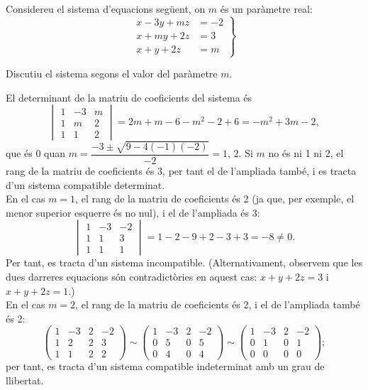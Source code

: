 Considereu el sistema d'equacions següent, on $m$ és un paràmetre real:
\[
\left.\begin{aligned}
x-3y+mz&=-2\\
x+my+2z&=3\\
x+y+2z&=m
\end{aligned}\right\}
\]

\begin{apartats}

Discutiu el sistema segons el valor del paràmetre $m$.

\begin{solucio}
El determinant de la matriu de coeficients del sistema és
\[
\begin{vmatrix}1&-3&m\\1&m&2\\1&1&2\end{vmatrix}=2m+m-6-m^2-2+6=-m^2+3m-2,
\]
que és 0 quan $m=\dfrac{-3\pm\sqrt{9-4(-1)(-2)}}{-2}=1,\,2$. Si $m$ no és ni 1 ni 2, el rang de la matriu de
coeficients és 3, per tant el de l'ampliada també, i es tracta d'un sistema compatible determinat.\\
En el cas $m=1$, el rang de la matriu de coeficients és 2 (ja que, per exemple, el menor superior esquerre és
no nul), i el de l'ampliada és 3:
\[
\begin{vmatrix}1&-3&-2\\1&1&3\\1&1&1\end{vmatrix}=1-2-9+2-3+3=-8\neq0 .
\]
Per tant, es tracta d'un sistema incompatible. (Alternativament, observem que les dues darreres equacions són
contradictòries en aquest cas: $x+y+2z=3$ i $x+y+2z=1$.)\\
En el cas $m=2$, el rang de la matriu de coeficients és 2, i el de l'ampliada també és 2:
\[
\left(\begin{array}{ccc|c}1&-3&2&-2\\1&2&2&3\\1&1&2&2\end{array}\right)\sim
\left(\begin{array}{ccc|c}1&-3&2&-2\\0&5&0&5\\0&4&0&4\end{array}\right)\sim
\left(\begin{array}{ccc|c}1&-3&2&-2\\0&1&0&1\\0&0&0&0\end{array}\right);
\]
per tant, es tracta d'un sistema compatible indeterminat amb un grau de llibertat.


\end{solucio}
\end{apartats}
